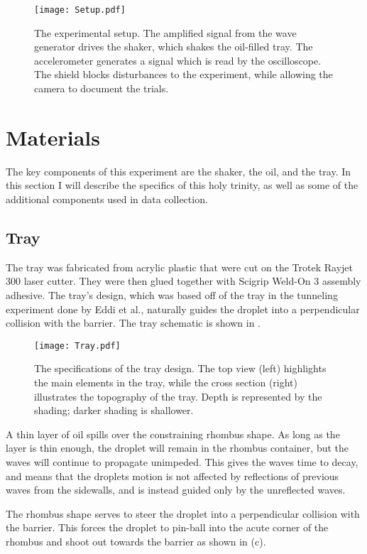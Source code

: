    
    
\begin{figure}[h!]
	\centering
	\texttt{[image: Setup.pdf]}
	\caption{The experimental setup. The amplified signal from the wave generator drives the shaker, which shakes the oil-filled tray. The accelerometer generates a signal which is read by the oscilloscope. The shield blocks disturbances to the experiment, while allowing the camera to document the trials.}
	\label{setup}
\end{figure}

\section{Materials}
The key components of this experiment are the shaker, the oil, and the tray. In this section I will describe the specifics of this holy trinity, as well as some of the additional components used in data collection. 

\subsection{Tray}
The tray was fabricated from acrylic plastic that were cut on the Trotek Rayjet 300 laser cutter. They were then glued together with Scigrip Weld-On 3 assembly adhesive. The tray's design, which was based off of the tray in the tunneling experiment done by Eddi et al., naturally guides the droplet into a perpendicular collision with the barrier. The tray schematic is shown in . 

\begin{figure}[h!]
	\centering
	\texttt{[image: Tray.pdf]}
	\caption{The specifications of the tray design. The top view (left) highlights the main elements in the tray, while the cross section (right) illustrates the topography of the tray. Depth is represented by the shading; darker shading is shallower.}
	\label{tray}
\end{figure}

A thin layer of oil spills over the constraining rhombus shape. As long as the layer is thin enough, the droplet will remain in the rhombus container, but the waves will continue to propagate unimpeded. This gives the waves time to decay, and means that the droplets motion is not affected by reflections of previous waves from the sidewalls, and is instead guided only by the unreflected waves. 

The rhombus shape serves to steer the droplet into a perpendicular collision with the barrier. This forces the droplet to pin-ball into the acute corner of the rhombus and shoot out towards the barrier as shown in (c).

